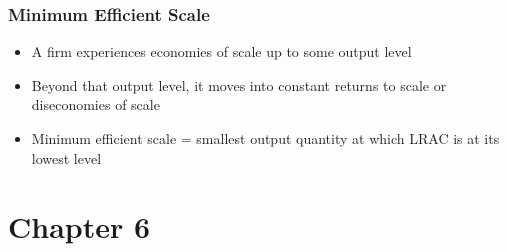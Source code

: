 \documentclass[11pt]{article}
\begin{document}
\subsubsection{Minimum Efficient Scale}
\label{sec:org5b475e1}
\begin{itemize}
\item A firm experiences economies of scale up to some output level
\item Beyond that output level, it moves into constant returns to scale or diseconomies of scale
\item Minimum efficient scale = smallest output quantity at which LRAC is at its lowest level
\end{itemize}
\section{Chapter 6}
\label{sec:orgbb0b8d3}
\end{document}
